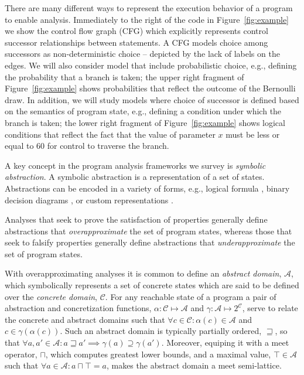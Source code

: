 There are many different ways to represent the execution behavior
of a program to enable analysis.  Immediately to the right of
the code in Figure~\ref{fig:example} we show the control flow graph (CFG)
which explicitly represents control successor relationships between
statements.  A CFG models choice among successors as non-deterministic
choice -- depicted by the lack of labels on the edges.
We will also consider model that include probabilistic choice,
e.g., defining the probability that a branch is taken; the
upper right fragment of Figure~\ref{fig:example} shows probabilities
that reflect the outcome of the Bernoulli draw.
In addition, we will study models where 
choice of successor is defined based on the semantics
of program state, e.g., defining a condition under which the branch
is taken; the lower right fragment of Figure~\ref{fig:example}
shows logical conditions that 
reflect the fact that the value of parameter $x$ must be
less or equal to $60$ for control to traverse the branch.

A key concept in the program analysis frameworks we survey is
\textit{symbolic abstraction}.  A symbolic abstraction is a 
representation of a set of states.  Abstractions can be encoded
in a variety of forms, e.g., logical formula \cite{bilateral}, binary
decision diagrams \cite{BDD}, or custom representations \cite{Parma}.

Analyses that seek to prove the satisfaction of properties generally
define abstractions that \textit{overapproximate} the set of program
states, whereas those that seek to falsify properties generally define
abstractions that \textit{underapproximate} the set of program states.

With overapproximating analyses it is common to define an \textit{abstract
domain}, $\mathcal{A}$, 
which symbolically represents a set of concrete states which 
are said to be defined over the \textit{concrete domain}, $\mathcal{C}$.
For any reachable state of a program a pair of abstraction 
and concretization functions, 
$\alpha : \mathcal{C} \mapsto \mathcal{A}$ and  
$\gamma : \mathcal{A} \mapsto 2^\mathcal{C}$,
serve to relate the concrete and abstract domains such that 
$\forall c \in \mathcal{C} : \alpha(c) \in \mathcal{A}$ and $c \in \gamma(\alpha(c))$.
Such an abstract domain is typically partially ordered, $\sqsupseteq$,
so that 
$\forall a,a' \in \mathcal{A} :  a \sqsupseteq a' \implies \gamma(a) \supseteq \gamma(a')$.
Moreover, equiping it with a meet operator, $\sqcap$, which
computes greatest lower bounds, and a maximal
value, $\top \in \mathcal{A}$ such that 
$\forall a \in \mathcal{A} : a \sqcap \top = a$, makes the
abstract domain a meet semi-lattice.

